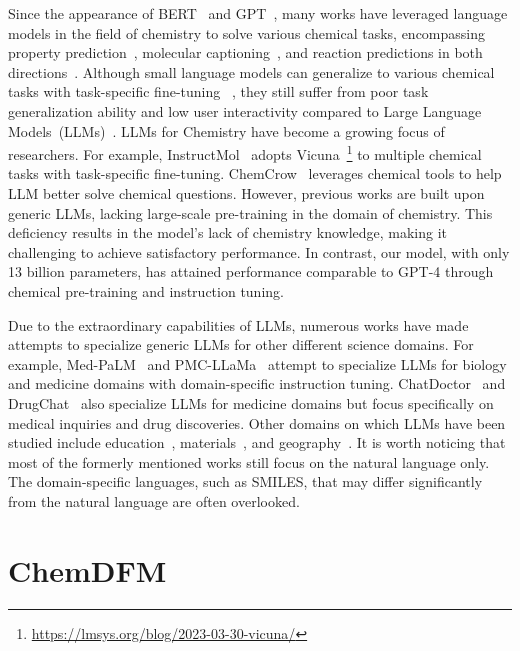 Since the appearance of BERT~\cite{devlin-etal-2019-bert} and GPT~\cite{radfordimproving}, many works have leveraged language models in the field of chemistry to solve various chemical tasks, encompassing property prediction~\cite{zhou2022uni,wu2023molformer},
molecular captioning~\cite{edwards-etal-2022-translation,christofidellis2023unifying}, and reaction predictions in both directions~\cite{schwaller2019molecular,schwaller2020predicting,Toniato2020UnassistedNR}. 
Although small language models can generalize to various chemical tasks with task-specific fine-tuning ~\cite{zeng2022deep,liu-etal-2023-molxpt}, they still suffer from poor task generalization ability and low user interactivity compared to Large Language Models~(LLMs)~\cite{du-etal-2022-glm,touvron2023llama,taylor2022galactica}.
LLMs for Chemistry have become a growing focus of researchers. For example, InstructMol~\cite{cao2023instructmol} adopts Vicuna~\footnote{\url{https://lmsys.org/blog/2023-03-30-vicuna/}} to multiple chemical tasks with task-specific fine-tuning.
ChemCrow~\cite{bran2023chemcrow} leverages chemical tools to help LLM better solve chemical questions. However, previous works are built upon generic LLMs, lacking large-scale pre-training in the domain of chemistry. This deficiency results in the model's lack of chemistry knowledge, making it challenging to achieve satisfactory performance. In contrast, our model, with only 13 billion parameters, has attained performance comparable to GPT-4 through chemical pre-training and instruction tuning.

Due to the extraordinary capabilities of LLMs, numerous works have made attempts to specialize generic LLMs for other different science domains.
For example, 
Med-PaLM~\cite{singhal2023large}
and PMC-LLaMa~\cite{wu2023pmcllama} attempt to specialize LLMs for biology and medicine domains with domain-specific instruction tuning.
ChatDoctor~\cite{li2023chatdoctor} and DrugChat~\cite{liang2023drugchat} also specialize LLMs for medicine domains but focus specifically on medical inquiries and drug discoveries. Other domains on which LLMs have been studied include education~\cite{dan2023educhat}, materials~\cite{xie2023darwin}, and geography~\cite{deng2023k2}. It is worth noticing that most of the formerly mentioned works still focus on the natural language only. The domain-specific languages, such as SMILES, that may differ significantly from the natural language are often overlooked.

\section{ChemDFM}


